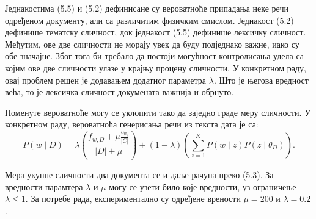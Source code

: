 Једнакостима (5.5) и (5.2) дефинисане су вероватноће припадања неке речи одређеном документу, али са различитим физичким смислом. Једнакост (5.2) дефинише тематску сличност, док једнакост (5.5) дефинише лексичку сличност. Међутим, ове две сличности не морају увек да буду подједнако важне, иако су обе значајне. Због тога би требало да постоји могућност контролисања удела са којим ове две сличности улазе у крајњу процену сличности. У конкретном раду, овај проблем решен је додавањем додатног параметра $\lambda$. Што је његова вредност већа, то је лексичка сличност докумената важнија и обрнуто.

Поменуте вероватноће могу се уклопити тако да заједно граде меру сличности. У конкретном раду, вероватноћа генерисања речи из текста дата је са:
\begin{equation}
P(w \mid D)  = \lambda(\frac{f_{w,D} + \mu\frac{c_{w_i}}{|C|}}{|D|+\mu}) + (1-\lambda)(\sum_{z=1}^{K} P(w \mid z)P(z \mid \theta_D)).
\end{equation}

Мера укупне сличности два документа се и даље рачуна преко (5.3).
За вредности парамтера $\lambda$ и $\mu$  могу се узети било које вредности, уз ограничење $\lambda \leq 1$. За потребе рада, експериментално су одређене врености $\mu = 200$ и $\lambda = 0.2$.
